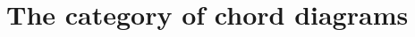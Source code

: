 \documentclass{beamer}
\theoremstyle{definition}
\theoremstyle{remark}
\begin{document}

\section{The category of chord diagrams}
\end{document}
